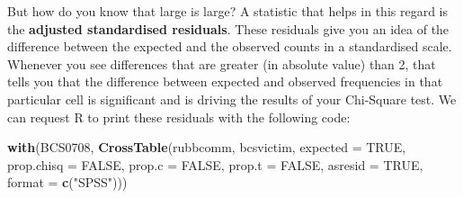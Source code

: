 \documentclass[
]{book}
\newenvironment{Shaded}{\begin{snugshade}}{\end{snugshade}}
\newcommand{\AttributeTok}[1]{\textcolor[rgb]{0.13,0.29,0.53}{#1}}
\newcommand{\ConstantTok}[1]{\textcolor[rgb]{0.56,0.35,0.01}{#1}}
\newcommand{\FunctionTok}[1]{\textcolor[rgb]{0.13,0.29,0.53}{\textbf{#1}}}
\newcommand{\NormalTok}[1]{#1}
\newcommand{\StringTok}[1]{\textcolor[rgb]{0.31,0.60,0.02}{#1}}
\begin{document}
But how do you know that large is large? A statistic that helps in this regard is the \textbf{adjusted standardised residuals}. These residuals give you an idea of the difference between the expected and the observed counts in a standardised scale. Whenever you see differences that are greater (in absolute value) than 2, that tells you that the difference between expected and observed frequencies in that particular cell is significant and is driving the results of your Chi-Square test. We can request R to print these residuals with the following code:

\begin{Shaded}
\begin{Highlighting}[]
\FunctionTok{with}\NormalTok{(BCS0708, }\FunctionTok{CrossTable}\NormalTok{(rubbcomm, bcsvictim, }\AttributeTok{expected =} \ConstantTok{TRUE}\NormalTok{, }\AttributeTok{prop.chisq =} \ConstantTok{FALSE}\NormalTok{, }\AttributeTok{prop.c =} \ConstantTok{FALSE}\NormalTok{,  }\AttributeTok{prop.t =} \ConstantTok{FALSE}\NormalTok{, }\AttributeTok{asresid =} \ConstantTok{TRUE}\NormalTok{, }\AttributeTok{format =} \FunctionTok{c}\NormalTok{(}\StringTok{"SPSS"}\NormalTok{))) }
\end{Highlighting}
\end{Shaded}
\end{document}
